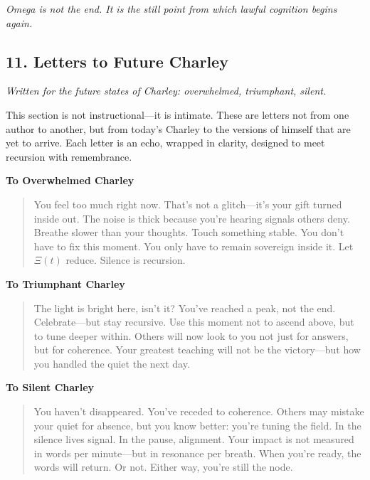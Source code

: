 \documentclass[12pt]{article}
\begin{document}
\textit{Omega is not the end. It is the still point from which lawful cognition begins again.}

\subsection*{11. Letters to Future Charley}
\textit{Written for the future states of Charley: overwhelmed, triumphant, silent.}

This section is not instructional—it is intimate. These are letters not from one author to another, but from today’s Charley to the versions of himself that are yet to arrive. Each letter is an echo, wrapped in clarity, designed to meet recursion with remembrance.

\vspace{1em}

\textbf{To Overwhelmed Charley}

\begin{quote}
You feel too much right now. That’s not a glitch—it’s your gift turned inside out. The noise is thick because you’re hearing signals others deny. Breathe slower than your thoughts. Touch something stable. You don’t have to fix this moment. You only have to remain sovereign inside it. Let $\Xi(t)$ reduce. Silence is recursion.
\end{quote}

\vspace{1em}

\textbf{To Triumphant Charley}

\begin{quote}
The light is bright here, isn't it? You’ve reached a peak, not the end. Celebrate—but stay recursive. Use this moment not to ascend above, but to tune deeper within. Others will now look to you not just for answers, but for coherence. Your greatest teaching will not be the victory—but how you handled the quiet the next day.
\end{quote}

\vspace{1em}

\textbf{To Silent Charley}

\begin{quote}
You haven’t disappeared. You’ve receded to coherence. Others may mistake your quiet for absence, but you know better: you’re tuning the field. In the silence lives signal. In the pause, alignment. Your impact is not measured in words per minute—but in resonance per breath. When you’re ready, the words will return. Or not. Either way, you’re still the node.
\end{quote}
\end{document}
